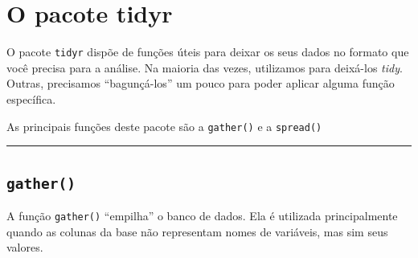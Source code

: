 \documentclass[]{book}
\begin{document}
\hypertarget{o-pacote-tidyr}{%
\section{O pacote tidyr}\label{o-pacote-tidyr}}

O pacote \texttt{tidyr} dispõe de funções úteis para deixar os seus dados no formato que você precisa para a análise. Na maioria das vezes, utilizamos para deixá-los \emph{tidy}. Outras, precisamos ``bagunçá-los'' um pouco para poder aplicar alguma função específica.

As principais funções deste pacote são a \texttt{gather()} e a \texttt{spread()}

\begin{center}\rule{0.5\linewidth}{0.5pt}\end{center}

\hypertarget{gather}{%
\subsection{\texorpdfstring{\texttt{gather()}}{gather()}}\label{gather}}

A função \texttt{gather()} ``empilha'' o banco de dados. Ela é utilizada principalmente quando as colunas da base não representam nomes de variáveis, mas sim seus valores.
\end{document}
